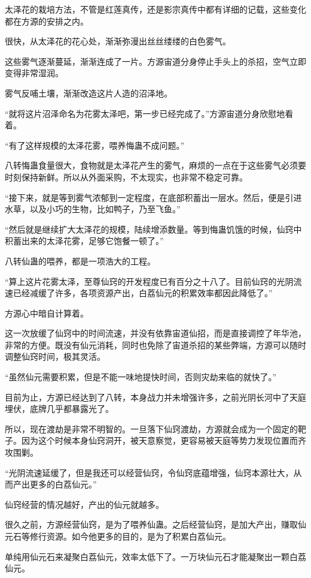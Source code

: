 \begin{this_body}
太泽花的栽培方法，不管是红莲真传，还是影宗真传中都有详细的记载，这些变化都在方源的安排之内。

很快，从太泽花的花心处，渐渐弥漫出丝丝缕缕的白色雾气。

这些雾气逐渐蔓延，渐渐连成了一片。方源宙道分身停止手头上的杀招，空气立即变得非常湿润。

雾气反哺土壤，渐渐改造这片人造的沼泽地。

“就将这片沼泽命名为花雾太泽吧，第一步已经完成了。”方源宙道分身欣慰地看着。

“有了这样规模的太泽花雾，喂养悔蛊不成问题。”

八转悔蛊食量很大，食物就是太泽花产生的雾气，麻烦的一点在于这些雾气必须要时刻保持新鲜。所以从外面采购，不太现实，也非常不稳定可靠。

“接下来，就是等到雾气浓郁到一定程度，在底部积蓄出一层水。然后，便是引进水草，以及小巧的生物，比如鸭子，乃至飞鱼。”

“然后就是继续扩大太泽花的规模，陆续增添数量。等到悔蛊饥饿的时候，仙窍中积蓄出来的太泽花雾，足够它饱餐一顿了。”

八转仙蛊的喂养，都是一项浩大的工程。

“算上这片花雾太泽，至尊仙窍的开发程度已有百分之十八了。目前仙窍的光阴流速已经减缓了许多，各项资源产出，白荔仙元的积累效率都因此降低了。”

方源心中暗自计算着。

这一次放缓了仙窍中的时间流速，并没有依靠宙道仙招，而是直接调控了年华池，非常的方便。既没有仙元消耗，同时也免除了宙道杀招的某些弊端，方源可以随时调整仙窍时间，极其灵活。

“虽然仙元需要积累，但是不能一味地提快时间，否则灾劫来临的就快了。”

目前为止，方源已经达到了八转，本身战力并未增强许多，之前光阴长河中了天庭埋伏，底牌几乎都暴露光了。

所以，现在渡劫是非常不明智的。一旦落下仙窍渡劫，方源就会成为一个固定的靶子。因为这个时候本身仙窍洞开，被天意察觉，更容易被天庭等势力发现位置而齐攻围剿。

“光阴流速延缓了，但是我还可以经营仙窍，令仙窍底蕴增强，仙窍本源壮大，从而产出更多的白荔仙元。”

仙窍经营的情况越好，产出的仙元就越多。

很久之前，方源经营仙窍，是为了喂养仙蛊。之后经营仙窍，是加大产出，赚取仙元石等修行资源。如今他更多的目的，是为了积累白荔仙元。

单纯用仙元石来凝聚白荔仙元，效率太低下了。一万块仙元石才能凝聚出一颗白荔仙元。


\end{this_body}
